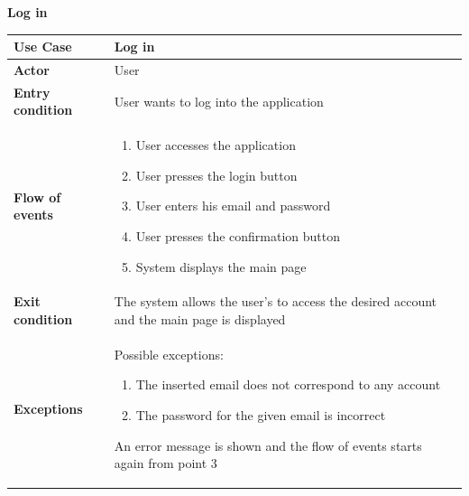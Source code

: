 \documentclass[../RASD.tex]{subfiles}
\begin{document}
        \textbf{Log in}
        \begin{table}[ht]
            \begin{center}
                \begin{tabular}{|m{10em}|m{30em}|}
                \hline
                \textbf{Use Case} & Log in\\
                \hline
                \textbf{Actor} & User\\
                \hline
                \textbf{Entry condition} & User wants to log into the application\\
                \hline
                \textbf{Flow of events} & 
                    \begin{enumerate}
                        \item User accesses the application
                        \item User presses the login button
                        \item User enters his email and password
                        \item User presses the confirmation button
                        \item System displays the main page
                    \end{enumerate}\\
                \hline
                \textbf{Exit condition} & The system allows the user's to access the desired account and the main page is displayed\\
                \hline
                \textbf{Exceptions} & 
                Possible exceptions:
                \begin{enumerate}
                    \item The inserted email does not correspond to any account
                    \item The password for the given email is incorrect
                \end{enumerate}
                An error message is shown and the flow of events
                starts again from point 3\\
                \hline
                \end{tabular}
            \end{center}
        \end{table}\newpage
\end{document}
